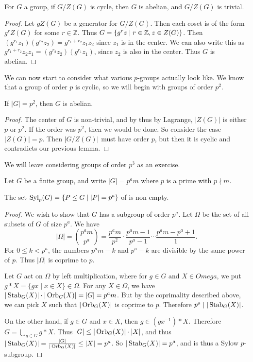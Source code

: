 \documentclass[a4paper]{scrreprt}
\begin{document}
\begin{lemma}
	For $G$ a group, if $G/Z(G)$ is cycle, then $G$ is abelian, and $G/Z(G)$ is trivial.
\end{lemma}
\begin{proof}
	Let $gZ(G)$ be a generator for $G/Z(G)$. Then each coset is of the form $g^r Z(G)$ for some $r \in \mathbb{Z}$. Thus $G = \{g^r z \mid r \in \mathbb{Z}, z \in Z(G) \}$.
	Then $(g^{r_1} z_1)(g^{r_2}z_2) = g^{r_1 + r_2} z_1 z_2$ since $z_1$ is in the center.
	We can also write this as $g^{r_1 + r_2}z_2 z_1 =  (g^{r_2} z_2)(g^{r_1} z_1)$, since $z_2$ is also in the center. Thus $G$ is abelian.
\end{proof}

We can now start to consider what various $p$-groups actually look like. We know that a group of order $p$ is cyclic, so we will begin with groups of order $p^2$.

\begin{corollary}
	If $|G| = p^2$, then $G$ is abelian.
\end{corollary}
\begin{proof}
	The center of $G$ is non-trivial, and by thus by Lagrange, $|Z(G)|$ is either $p$ or $p^2$. If the order was $p^2$, then we would be done. So consider the case $|Z(G)| = p$. Then $|G/Z(G)|$ must have order $p$, but then it is cyclic and contradicts our previous lemma.
\end{proof}

We will leave considering groups of order $p^3$ as an exercise.


Let $G$ be a finite group, and write $|G| = p^a m$ where $p$ is a prime with $p \nmid m$.

\begin{theorem}
	The set $\operatorname{Syl}_p(G) = \{P \leq G \mid |P| = p^a \}$ of  is non-empty.
\end{theorem}
\begin{proof}
	We wish to show that $G$ has a subgroup of order $p^a$.
	Let $\Omega$ be the set of all subsets of $G$ of size $p^a$.
	We have
	$$
	|\Omega| = \binom{p^a m}{p^a} = \frac{p^a m}{p^2} \cdot \frac{p^a m - 1}{p^a - 1} \cdots \frac{p^a m - p^a + 1}{1}.
	$$
	For $0 \leq k < p^a$, the numbers $p^am - k$ and $p^a  -k$ are divisible by the same power of $p$. Thus $|\Omega|$ is coprime to $p$.

	Let $G$ act on $\Omega$ by left multiplication, where for $g \in G
$ and $X \in Omega$, we put $g*X = \{gx \mid x \in X\} \in \Omega$. For any $X \in \Omega$, we have $|\operatorname{Stab}_G(X)| \cdot |\operatorname{Orb}_G(X)| = |G| = p^a m$. But by the coprimality described above, we can pick $X$ such that $|\operatorname{Orb}_G(X)|$ is coprime to $p$. Therefore $p^a \mid |\operatorname{Stab}_G(X)|$.

On the other hand, if $g \in G$ and $x \in X$, then $g \in (g x^{-1}) * X$. Therefore $G = \bigcup_{g \in G} g*X$. Thus $|G| \leq |\operatorname{Orb}_G(X)| \cdot |X|$, and thus $|\operatorname{Stab}_G(X)| = \frac{|G|}{|\operatorname{Orb}_G(X)|} \leq |X| = p^a$. So $|\operatorname{Stab}_G(X)| = p^a$, and is thus a Sylow $p$-subgroup.
\end{proof}
\end{document}
